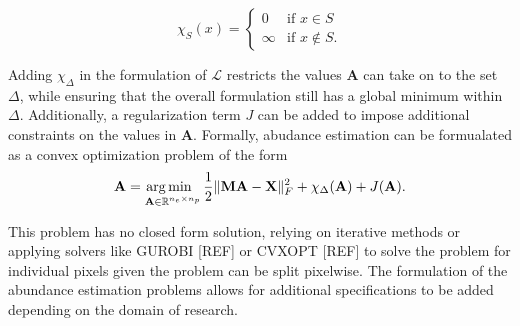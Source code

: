\begin{equation}
    \label{ae:indfunc}
    \chi_{S}(x) = 
            \begin{cases}
            0 &\text{if } x \in S \\
            \infty &\text{if } x \not \in S.
            \end{cases}
\end{equation}

Adding $\chi_\Delta$ in the formulation of $\mathcal{L}$ restricts the values $\mathbf{A}$ can take on to the set $\Delta$, while ensuring that the overall formulation still has a global minimum within $\Delta$. Additionally, a regularization term $J$ can be added to impose additional constraints on the values in $\mathbf{A}$. Formally, abudance estimation can be formualated as a convex optimization problem of the form 
\begin{equation}
    \label{ae:ae-min-1}
    \mathbf{A} = \operatorname*{arg\,min \;\;}_{\mathbf{A} \in \mathbb{R}^{n_e \times n_p}} \frac{1}{2}\|\mathbf{MA} - \mathbf{X}\|_F^2 + \chi_\Delta(\mathbf{A}) + J(\mathbf{A}).
\end{equation}

This problem has no closed form solution, relying on iterative methods or applying solvers like GUROBI [REF] or CVXOPT [REF] to solve the problem for individual pixels given the problem can be split pixelwise. The formulation of the abundance estimation problems allows for additional specifications to be added depending on the domain of research. 
